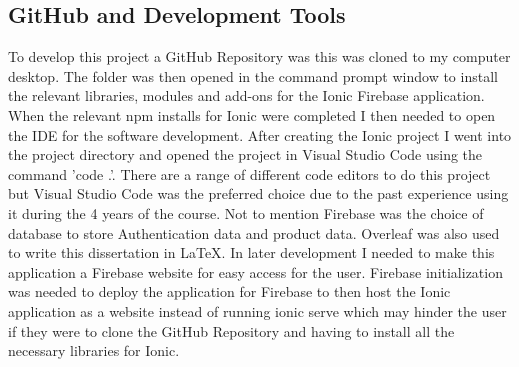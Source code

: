 \subsection{GitHub and Development Tools}
To develop this project a GitHub Repository was this was cloned to my computer desktop. The folder was then opened in the command prompt window to install the relevant libraries, modules and add-ons for the Ionic Firebase application. When the relevant npm installs for Ionic were completed I then needed to open the IDE for the software development. After creating the Ionic project I went into the project directory and opened the project in Visual Studio Code using the command 'code .'. There are a range of different code editors to do this project but Visual Studio Code was the preferred choice due to the past experience using it during the 4 years of the course. Not to mention Firebase was the choice of database to store Authentication data and product data. Overleaf was also used to write this dissertation in LaTeX. In later development I needed to make this application a Firebase website for easy access for the user. Firebase initialization was needed to deploy the application for Firebase to then host the Ionic application as a website instead of running ionic serve which may hinder the user if they were to clone the GitHub Repository and having to install all the necessary libraries for Ionic.